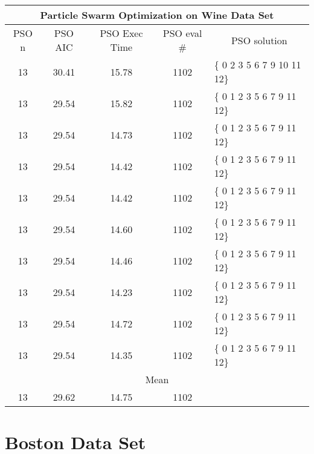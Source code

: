 \begin{tabular}{|c|c|c|c|l|}
	\hline
	\multicolumn{5}{|c|}{Particle Swarm Optimization on Wine Data Set}                                    \\ \hline
	PSO n & PSO AIC     & PSO Exec Time & PSO eval \# & \multicolumn{1}{c|}{PSO solution} \\ \hline
	13    & 30.41 & 15.78             & 1102                   & \{ 0 2 3 5 6 7 9 10 11 12\}       \\ \hline
	13    & 29.54 & 15.82             & 1102                   & \{ 0 1 2 3 5 6 7 9 11 12\}        \\ \hline
	13    & 29.54 & 14.73             & 1102                   & \{ 0 1 2 3 5 6 7 9 11 12\}        \\ \hline
	13    & 29.54 & 14.42             & 1102                   & \{ 0 1 2 3 5 6 7 9 11 12\}        \\ \hline
	13    & 29.54 & 14.42             & 1102                   & \{ 0 1 2 3 5 6 7 9 11 12\}        \\ \hline
	13    & 29.54 & 14.60             & 1102                   & \{ 0 1 2 3 5 6 7 9 11 12\}        \\ \hline
	13    & 29.54 & 14.46             & 1102                   & \{ 0 1 2 3 5 6 7 9 11 12\}        \\ \hline
	13    & 29.54 & 14.23             & 1102                   & \{ 0 1 2 3 5 6 7 9 11 12\}        \\ \hline
	13    & 29.54 & 14.72             & 1102                   & \{ 0 1 2 3 5 6 7 9 11 12\}        \\ \hline
	13    & 29.54 & 14.35             & 1102                   & \{ 0 1 2 3 5 6 7 9 11 12\}        \\ \hline
	\multicolumn{5}{|c|}{Mean}                                                                            \\ \hline
	13    & 29.62 & 14.75           & 1102                   &                                   \\ \hline
\end{tabular}


\section{Boston Data Set}
